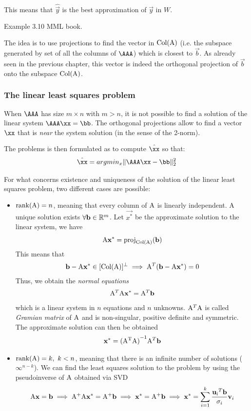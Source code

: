 This means that $\hat{\vec{y}}$ is the best approximation of $\vec{y}$ in $W$.

Example 3.10 MML book.

The idea is to use projections to find the vector in $\text{Col}(\mathrm{A})$ (i.e. the subspace generated by set of all the columns of $\AAA$) which is closest to $\vec{b}$. As already seen in the previous chapter, this vector is indeed the orthogonal projection of $\vec{b}$ onto the subspace $\text{Col}(\mathrm{A})$.

\subsubsection{The linear least squares problem}

When $\AAA$ has size $m \times n$ with $m>n$, it is not possible to find a solution of the linear system $\AAA \xx=\bb$.
The orthogonal projections allow to find a vector $\xx$ that is \textit{near} the system solution (in the sense of the 2-norm).

The problems is then formulated as to compute 
 $\hat{\xx}$ so that:
\begin{equation}
   \hat{\xx}= argmin_x \|\AAA \xx-\bb\|_2^2
   \label{llsq}
\end{equation}

For what concerns existence and uniqueness of the solution of the linear least squares problem, 
two different cases are possible:

\begin{itemize}
    \item $\mathrm{rank}(\mathrm{A}) = n$, meaning that every column of $\mathrm{A}$ is linearly independent. A unique solution exists $\forall \mathbf{b} \in \mathbb{R}^m$. Let $\vec{x^{*}}$ be the approximate solution to the linear system, we have
    $$ \mathrm{A}\mathbf{x^{*}} = \text{proj}_{\text{Col}(\mathrm{A})}(\mathbf{b}) $$
    This means that
    $$ \mathbf{b} - \mathrm{A}\mathbf{x^{*}} \in [\text{Col}(\mathrm{A})]^{\perp} \implies \mathrm{A}^T(\mathbf{b} - \mathrm{A}\mathbf{x^{*}}) = 0 $$
    Thus, we obtain the \textit{normal equations}
    $$ \mathrm{A}^T\mathrm{A}\mathbf{x^{*}} = \mathrm{A}^T\mathbf{b} $$
    which is a linear system in $n$ equations and $n$ unknowns. $\mathrm{A}^T\mathrm{A}$ is called \textit{Gramian matrix} of $\mathrm{A}$ and is non-singular, positive definite and symmetric. The approximate solution can then be obtained
    $$ \mathbf{x^{*}} = \mathrm{(\mathrm{A}^T\mathrm{A})}^{-1}\mathrm{A}^T\mathbf{b} $$
    \item $\mathrm{rank}(\mathrm{A}) = k,\ k < n$, meaning that there is an infinite number of solutions ($\infty^{n-k}$). We can find the least squares solution to the problem by using the pseudoinverse of $\mathrm{A}$ obtained via SVD
    $$ \mathrm{A}\mathbf{x} = \mathbf{b} \implies \mathrm{A}^{+}\mathrm{A}\mathbf{x^{*}} = \mathrm{A}^{+}\mathbf{b} \implies \mathbf{x^{*}} = \mathrm{A}^{+}\mathbf{b} \implies \mathbf{x^{*}} = \sum_{i=1}^{k}{\frac{\mathrm{\mathbf{u}_i}^T\mathbf{b}}{\sigma_i}\mathbf{v}_i} $$
\end{itemize}


